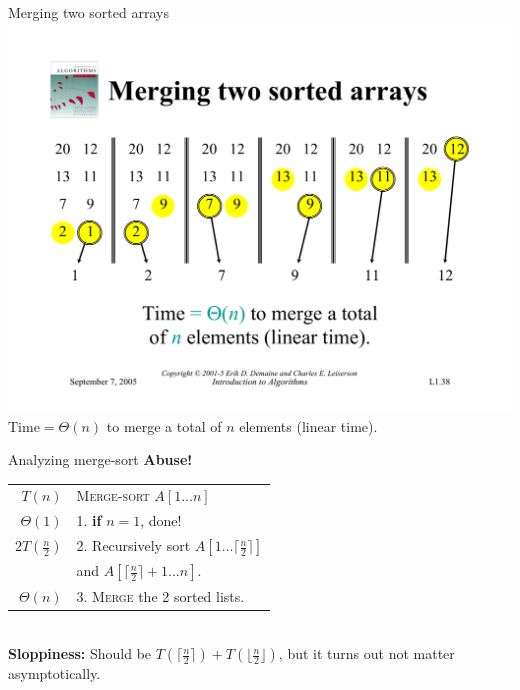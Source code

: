 \documentclass{beamer}
\begin{document}
\begin{frame}{Merging two sorted arrays}
    \centering
    \includegraphics[width=\textwidth, trim={1.1cm 6cm 1.1cm 4.95cm}, clip]{pages/lec1_38}\\
    \vspace{2mm}
    Time$= \Theta(n)$ to merge a total of $n$ elements (linear time).
\end{frame}

\begin{frame}{Analyzing merge-sort} 
    \large \textbf{Abuse!} \\
    \vspace{10mm}
    \Large
    \begin{tabular}{r | l}
        $T(n)$                         & \textsc{Merge-sort} $A[1 \ldots n]$ \\
        $\Theta(1)$                 & \hspace{1em} 1. \textbf{if} $n = 1$, done! \\
        $2T(\frac{n}{2})$       & \hspace{1em} 2. Recursively sort $A[ 1 \ldots \lceil \frac{n}{2} \rceil ]$ \\
                                         & \hspace{2em}      and $A[ \lceil \frac{n}{2} \rceil + 1 \ldots n ]$. \\
        $\Theta(n)$                 & \hspace{1em} 3. \textsc{Merge} the 2 sorted lists. 
    \end{tabular} \\
    \vspace{10mm}
    {\large \textbf{Sloppiness:} Should be $T(\lceil \frac{n}{2} \rceil) + T(\lfloor \frac{n}{2} \rfloor)$, but it turns out not matter asymptotically.}
\end{frame}
\end{document}
